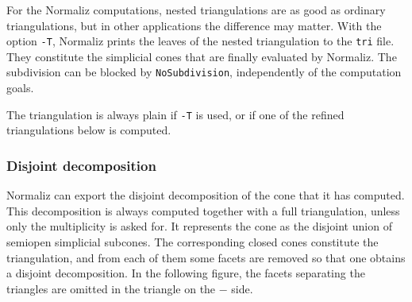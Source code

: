 For the Normaliz computations, nested triangulations are as good as ordinary triangulations, but in other applications the difference may matter. With the option \verb|-T|, Normaliz prints the leaves of the nested triangulation to the \verb|tri| file. They constitute the simplicial cones that are finally evaluated by Normaliz. The subdivision can be blocked by \verb|NoSubdivision|, independently of the computation goals.

The triangulation is always plain if \verb|-T| is used, or if one of the refined triangulations below is computed.

\subsubsection{Disjoint decomposition}\label{Disjoint}

Normaliz can export the disjoint decomposition of the cone that it has computed. This decomposition is always computed together with a full triangulation, unless only the multiplicity is asked for. It represents the cone as the disjoint union of semiopen simplicial subcones. The corresponding closed cones constitute the triangulation, and from each of them some facets are removed so that one obtains a disjoint decomposition. In the following figure, the facets separating the triangles are omitted in the triangle on the $-$ side.

